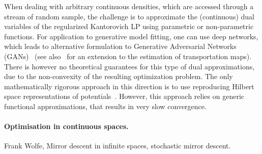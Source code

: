 When dealing with arbitrary continuous densities, which are accessed through a
stream of random sample, the challenge is to approximate  the (continuous) dual
variables of the regularized Kantorovich LP using parametric or non-parametric functions. For application to
generative model fitting, one can use deep networks, which leads to alternative
formulation to Generative Adversarial Networks (GANs)~\cite{arjovsky2017wgan}
(see also~\citet{seguy2018large} for an extension to the estimation of
transportation maps). There is however no theoretical guarantees for this type
of dual approximations, due to the non-convexity of the resulting optimization
problem. The only mathematically rigorous approach in this direction is to use
reproducing Hilbert space representations of
potentials~\cite{2016-genevay-nips}. However, this approach relies on generic functional
approximations, that results in very slow convergence.

\paragraph{Optimisation in continuous spaces.} Frank Wolfe, Mirror descent in infinite spaces, stochastic mirror descent.